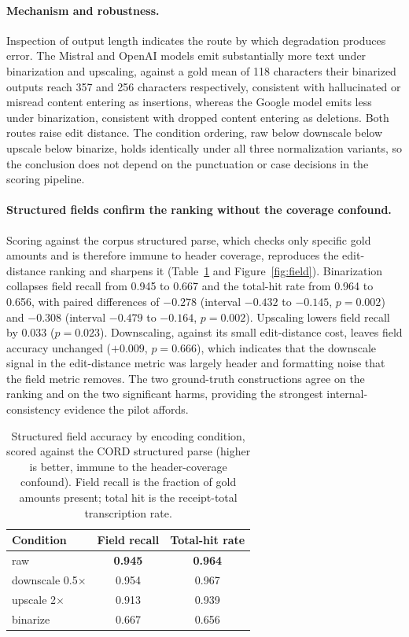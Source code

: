 \documentclass[11pt]{article}
\begin{document}
\paragraph{Mechanism and robustness.}
Inspection of output length indicates the route by which degradation produces error. The Mistral and
OpenAI models emit substantially more text under binarization and upscaling, against a gold mean of
118 characters their binarized outputs reach 357 and 256 characters respectively, consistent with
hallucinated or misread content entering as insertions, whereas the Google model emits less under
binarization, consistent with dropped content entering as deletions. Both routes raise edit
distance. The condition ordering, raw below downscale below upscale below binarize, holds identically
under all three normalization variants, so the conclusion does not depend on the punctuation or
case decisions in the scoring pipeline.

\paragraph{Structured fields confirm the ranking without the coverage confound.}
Scoring against the corpus structured parse, which checks only specific gold amounts and is therefore
immune to header coverage, reproduces the edit-distance ranking and sharpens it (Table~\ref{tab:field}
and Figure~\ref{fig:field}). Binarization collapses field recall from 0.945 to 0.667 and the
total-hit rate from 0.964 to 0.656, with paired differences of $-0.278$ (interval $-0.432$ to
$-0.145$, $p = 0.002$) and $-0.308$ (interval $-0.479$ to $-0.164$, $p = 0.002$). Upscaling lowers
field recall by 0.033 ($p = 0.023$). Downscaling, against its small edit-distance cost, leaves field
accuracy unchanged ($+0.009$, $p = 0.666$), which indicates that the downscale signal in the
edit-distance metric was largely header and formatting noise that the field metric removes. The two
ground-truth constructions agree on the ranking and on the two significant harms, providing the
strongest internal-consistency evidence the pilot affords.

\begin{table}[h]
\centering
\caption{Structured field accuracy by encoding condition, scored against the CORD structured parse
(higher is better, immune to the header-coverage confound). Field recall is the fraction of gold
amounts present; total hit is the receipt-total transcription rate.}
\label{tab:field}
\begin{tabular}{lcc}
\toprule
Condition & Field recall & Total-hit rate \\
\midrule
raw            & \textbf{0.945} & \textbf{0.964} \\
downscale 0.5$\times$ & 0.954 & 0.967 \\
upscale 2$\times$     & 0.913 & 0.939 \\
binarize       & 0.667 & 0.656 \\
\bottomrule
\end{tabular}
\end{table}
\end{document}
